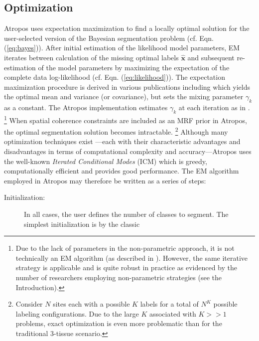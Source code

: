 \documentclass[11pt,english]{article}
\begin{document}
{\subsection{Optimization}
Atropos uses expectation maximization to find a locally optimal
solution for the user-selected version of the Bayesian segmentation
problem (cf. Eqn. (\ref{eq:bayes})).
After initial estimation of the
likelihood model parameters, EM iterates between calculation of the
missing optimal labels $\hat{\mathbf{x}}$ and subsequent re-estimation of the model
parameters by maximizing the expectation of the complete data
log-likelihood (cf. Eqn. (\ref{eq:likelihood})).  
The expectation maximization procedure is derived in various
publications including \cite{Zhang2001} which yields the optimal mean
and variance (or covariance), but sets the mixing parameter $\gamma_k$
as a constant.  The Atropos implementation estimates $\gamma_k$ at
each iteration as in \cite{Ashburner2005}.
\footnote{
Due to the lack of parameters in the non-parametric approach, it is not technically an EM algorithm (as described in \cite{Wells1996}).  However, the same iterative strategy is applicable and is quite robust in practice as evidenced by the number of researchers employing non-parametric strategies (see the Introduction).
}  
When spatial coherence constraints are included as an MRF prior in Atropos, the optimal segmentation solution becomes intractable.%
\footnote{
Consider $N$ sites each with a possible $K$ labels for a total of $N^K$ possible labeling configurations.  Due to the large $K$ associated with $K>>1$ problems, exact optimization is even more problematic than for the traditional 3-tissue scenario.
}
Although many optimization techniques exist \citep[see the
introduction in][for a concise summary of the myriad optimization
possibilities]{Marroquin2002}---each with their characteristic
advantages and disadvantages in terms of computational complexity and
accuracy---Atropos uses the well-known {\em Iterated Conditional
  Modes} (ICM)  \citep{Besag1986} which is greedy, computationally
efficient and provides good performance.  The EM algorithm employed in
Atropos may therefore be written as a series of steps:
\begin{description}
\item[Initialization:] In all cases, the user defines the number of
classes to segment.  The simplest initialization is by the classic

\end{description}}
\end{document}
